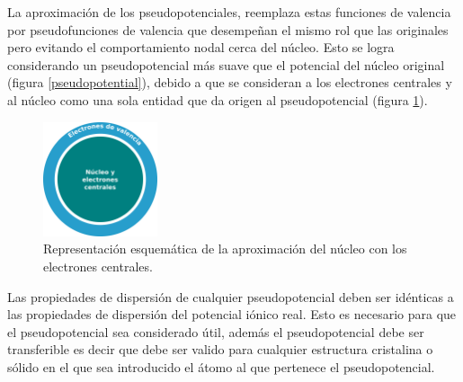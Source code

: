 \noindent La aproximaci\'on de los pseudopotenciales, reemplaza estas funciones 
de 
valencia por pseudofunciones de valencia que desempe\~nan el mismo rol 
que las 
originales pero evitando el comportamiento nodal cerca del n\'ucleo. 
Esto se 
logra considerando un pseudopotencial m\'as suave que el potencial del 
n\'ucleo 
original (figura \ref{pseudopotential}), debido a que se consideran a 
los 
electrones centrales y al n\'ucleo como una sola entidad que da origen 
al 
pseudopotencial (figura \ref{ElectronUnion}).

\begin{figure}[H]
    \centering
    \includegraphics[width=0.3\textwidth]{contenido/marco_teorico/pseudopotencial/img_pseudopotencial/ElectronUnion.png}
    \caption[Representaci\'on esquem\'atica de la aproximaci\'on del 
    n\'ucleo 
    con los electrones centrales]{Representaci\'on esquem\'atica de la 
    aproximaci\'on del 
    n\'ucleo 
    con los electrones centrales.}
    \label{ElectronUnion}
\end{figure}

\noindent Las propiedades de dispersi\'on de cualquier pseudopotencial deben 
ser 
id\'enticas a las propiedades de dispersi\'on del potencial i\'onico 
real. Esto 
es necesario para que el pseudopotencial sea considerado \'util, adem\'as el 
pseudopotencial debe ser transferible es decir que debe ser valido para 
cualquier 
estructura cristalina o s\'olido en el que sea introducido el \'atomo al 
que 
pertenece el pseudopotencial.